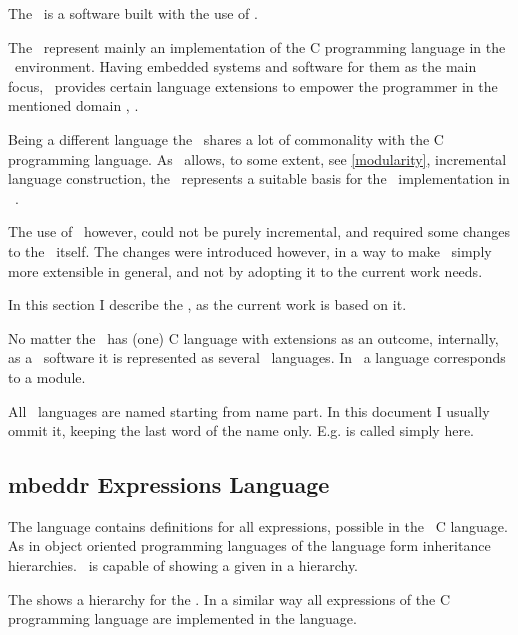 
The \mbdp\ is a software built with the use of \jbmps.

The \mbdrp\ represent mainly an implementation of the C programming language in the \jbmps\ environment. Having embedded systems
and software for them as the main focus, \mbdr\ provides certain language extensions to empower the programmer in the mentioned domain \cite{mbeddr-wave}, 
\cite{Voelter:MoDELS:2010}. 

Being a different language the \cpppl\ shares a lot of commonality with the C programming language. 
As \jbmps\ allows, to some extent, see \ref{modularity}, incremental language construction, the \mbdrp\ represents 
a suitable basis for the \cpppl\ implementation in \jbmps\ . 

The use of \mbdr\, however, could not be purely incremental, and required some changes to the \mbdr\ itself. 
The changes were introduced however, in a way to make \mbdr\ simply more extensible in general, and not by
adopting it to the current work needs.

In this section I describe the \mbdp, as the current work is based on it.

No matter the \mbdp\ has  (one) C language with extensions as an outcome, internally, as a \jbmps\ software
it is represented as several \jbmps\ languages. In \jbmps\ a language corresponds to a module.

All \mbdr\ languages are named starting from  name part. In this document I usually ommit it,
keeping the last word of the name only. E.g.  is called simply  here.

\subsection{mbeddr Expressions Language}
\label{expressionslang}

The  language contains definitions for all expressions, possible in the \mbdr\ C language.
As in object oriented programming languages  of the  language form inheritance hierarchies. 
\jbmps\ is capable of showing a given  in a hierarchy. 


The  shows a hierarchy for the  . In a similar way all expressions of the 
C programming language are implemented in the  language.

